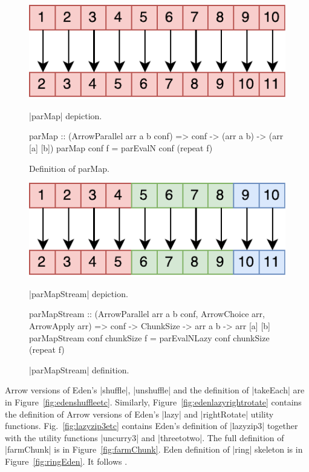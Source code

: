 \begin{figure}[thb]
\includegraphics[scale=0.7]{images/parMap}
\caption{|parMap| depiction.}
\label{fig:parMapImg}

\begin{code}
parMap :: (ArrowParallel arr a b conf) => conf -> (arr a b) -> (arr [a] [b])
parMap conf f = parEvalN conf (repeat f)
\end{code}
\caption{Definition of parMap.}
\label{fig:parMap}

\includegraphics[scale=0.7]{images/parMapStream}
\caption{|parMapStream| depiction.}
\label{fig:parMapStreamImg}

\begin{code}
parMapStream :: (ArrowParallel arr a b conf, ArrowChoice arr, ArrowApply arr) =>
	conf -> ChunkSize -> arr a b -> arr [a] [b]
parMapStream conf chunkSize f = parEvalNLazy conf chunkSize (repeat f)
\end{code}
\caption{|parMapStream| definition.}
\label{fig:parMapStream}
\end{figure}

Arrow versions of Eden's |shuffle|, |unshuffle| and the definition of |takeEach| are in Figure~\ref{fig:edenshuffleetc}. Similarly, Figure~\ref{fig:edenlazyrightrotate} contains the definition of Arrow versions of Eden's |lazy| and |rightRotate| utility functions. Fig.~\ref{fig:lazyzip3etc} contains Eden's definition of |lazyzip3| together with the utility functions |uncurry3| and |threetotwo|.
The full definition of |farmChunk| is in Figure~\ref{fig:farmChunk}.
Eden definition of |ring| skeleton is in Figure~\ref{fig:ringEden}. It
follows \citet{Loogen2012}.

